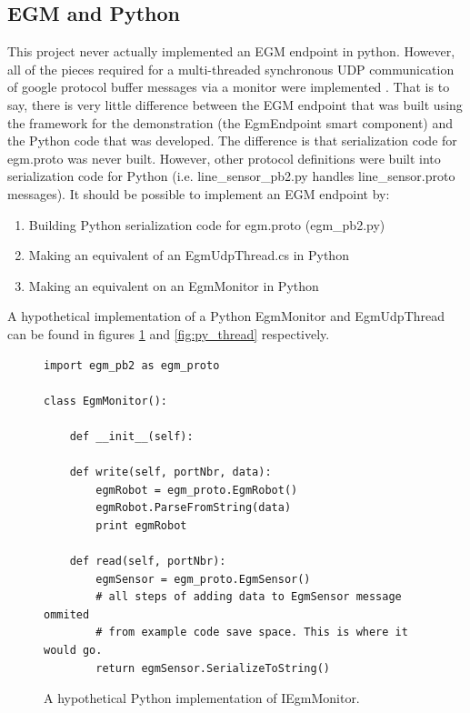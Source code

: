 \documentclass{cslthse-msc}
\begin{document}
\begin{appendices}
\section{EGM and Python}
\label{app:Hypothetical:python}
This project never actually implemented an EGM endpoint in python. However, all of the pieces required for a multi-threaded synchronous UDP communication of google protocol buffer messages via a monitor were implemented \cite{Greg:Jupyter}. That is to say, there is very little difference between the EGM endpoint that was built using the framework for the demonstration (the EgmEndpoint smart component) and the Python code that was developed. The difference is that serialization code for egm.proto was never built. However, other protocol definitions were built into serialization code for Python (i.e. line\_sensor\_pb2.py handles line\_sensor.proto messages). It should be possible to implement an EGM endpoint by:
\begin{enumerate}
    \item Building Python serialization code for egm.proto (egm\_pb2.py)
    \item Making an equivalent of an EgmUdpThread.cs in Python
    \item Making an equivalent on an EgmMonitor in Python
\end{enumerate}
A hypothetical implementation of a Python EgmMonitor and EgmUdpThread can be found in figures \ref{fig:py_monitor} and \ref{fig:py_thread} respectively. 

\lstset{language=Python}
\begin{figure}[H]
\centering
\begin{lstlisting}[fontadjust]
import egm_pb2 as egm_proto

class EgmMonitor():
    
    def __init__(self):
    
    def write(self, portNbr, data):
        egmRobot = egm_proto.EgmRobot()
        egmRobot.ParseFromString(data)
        print egmRobot
            
    def read(self, portNbr):
        egmSensor = egm_proto.EgmSensor()
        # all steps of adding data to EgmSensor message ommited 
        # from example code save space. This is where it would go.
        return egmSensor.SerializeToString()
\end{lstlisting}
\caption{A hypothetical Python implementation of IEgmMonitor.}
\label{fig:py_monitor}
\end{figure}


\end{appendices}
\end{document}
